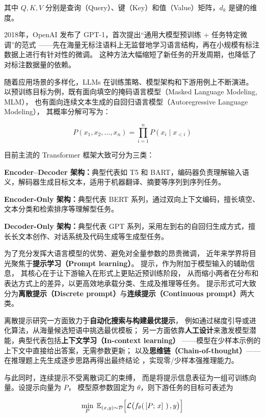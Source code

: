 \documentclass{xmu}
\begin{document}
其中 $Q, K, V$ 分别是查询（Query）、键（Key）和值（Value）矩阵，$d_k$ 是键的维度。

2018年，OpenAI 发布了 GPT-1，首次提出“通用大模型预训练 + 任务特定微调”的范式
——先在海量无标注语料上无监督地学习语言结构，再在小规模有标注数据上进行有针对性的微调。
这种方法大幅缩短了新任务的开发周期，也降低了对标注数据量的依赖。

随着应用场景的多样化，LLMs 在训练策略、模型架构和下游用例上不断演进。
以预训练目标为例，既有面向填空的掩码语言模型（Masked Language Modeling, MLM），
也有面向连续文本生成的自回归语言模型（Autoregressive Language Modeling），
其概率分解可写为：

$$
P(x_1, x_2, \dots, x_n) = \prod_{i=1}^n P(x_i \mid x_{<i})
$$

目前主流的 Transformer 框架大致可分为三类：

{\bf Encoder–Decoder 架构：}典型代表如 T5 和 BART，编码器负责理解输入语义，解码器生成目标文本，适用于机器翻译、摘要等序列到序列任务。

{\bf Encoder-Only 架构：}典型代表 BERT 系列，通过双向上下文编码，擅长填空、文本分类和检索排序等理解型任务。

{\bf Decoder-Only 架构：}典型代表 GPT 系列，采用左到右的自回归生成方式，擅长长文本创作、对话系统及代码生成等生成型任务。


为了充分发挥大语言模型的优势、避免对全量参数的昂贵微调，
近年来学界将目光聚焦于{\bf 提示学习（Prompt learning）}。
提示，作为附加于模型输入的辅助信息，
其核心在于让下游输入在形式上更贴近预训练阶段，
从而缩小两者在分布和表达方式上的差异，以更高效地承载分类、生成及推理等任务。
提示形式可大致分为{\bf 离散提示（Discrete prompt）}与{\bf 连续提示（Continuous prompt）}两大类。

离散提示研究一方面致力于{\bf 自动化搜索与构建最优提示}，
例如通过梯度引导或进化算法，从海量候选短语中挑选最优模板；
另一方面依靠{\bf 人工设计}来激发模型潜能，典型代表包括{\bf 上下文学习（In-context learning）}
——模型在少样本示例的上下文中直接给出答案，无需参数更新；
以及{\bf 思维链（Chain-of-thought）}——在推理题上先生成逐步思路再得出最终结论
，实现零/少样本强推理能力。

与此同时，连续提示不受离散词汇的束缚，
而是将提示信息表征为一组可训练向量。设提示向量为 $P$，
模型原参数固定为 $\theta$，则下游任务的目标可表述为

$$
\min_{P}\;\mathbb{E}_{(x,y)\sim \mathcal{D}}\Bigl[\mathcal{L}\bigl(f_{\theta}(\,[P;\,x]\ )\,,y\bigr)\Bigr]
$$
\end{document}
